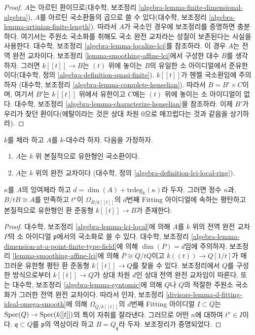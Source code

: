 \begin{proof}
$A$는 아르틴 환이므로(대수학, 보조정리
\ref{algebra-lemma-finite-dimensional-algebra}), $A$를 아르틴 국소환들의
곱으로 쓸 수 있다(대수학, 보조정리
\ref{algebra-lemma-artinian-finite-length}). 따라서 $A$가 국소인 경우에
보조정리를 증명하면 충분하다. 여기서는 주원소 국소화를 취해도 국소 완전
교차라는 성질이 보존된다는 사실을 사용한다. 대수학, 보조정리
\ref{algebra-lemma-localize-lci}를 참조하라. 이 경우 $A$는 전역 완전
교차이다. 보조정리 \ref{lemma-smoothing-affine-lci}에서 구성한 대수
$B$를 생각하자. 그러면 $k[[t]] \to B$는 $(t)$ 위에 놓이는 $B$의 유일한
소 아이디얼에서 준유한이다(대수학, 정의
\ref{algebra-definition-quasi-finite}). $k[[t]]$가 헨젤 국소환임에 주의하자
(대수학, 보조정리 \ref{algebra-lemma-complete-henselian}). 따라서
$B = B' \times C$이며, 여기서 $B'$는 $k[[t]]$ 위에서 유한이고 $C$에는
$(t)$ 위에 놓이는 소 아이디얼이 없다. 대수학, 보조정리
\ref{algebra-lemma-characterize-henselian}을 참조하라. 이제 $B'$가 우리가
찾던 환이다(에탈이라는 것은 상대 차원 $0$으로 매끄럽다는 것과 같음을
상기하라).
\end{proof}

\begin{lemma}
\label{lemma-smoothing-at-lci-point}
$k$를 체라 하고 $A$를 $k$-대수라 하자. 다음을 가정하자.
\begin{enumerate}
\item $A$는 $k$ 위 본질적으로 유한형인 국소환이다.
\item $A$는 $k$ 위의 완전 교차이다
(대수학, 정의 \ref{algebra-definition-lci-local-ring}).
\end{enumerate}
$\kappa$를 $A$의 잉여체라 하고
$d = \dim(A) + \text{trdeg}_k(\kappa)$라 두자. 그러면 정수 $n$과,
$B/tB \cong A$를 만족하고 $t^n$이 $\Omega_{B/k[[t]]}$의 $d$번째 Fitting
아이디얼에 속하는 평탄하고 본질적으로 유한형인 환 준동형
$k[[t]] \to B$가 존재한다.%
\end{lemma}

\begin{proof}
대수학, 보조정리 \ref{algebra-lemma-lci-local}에 의해 $A$를 $k$ 위의
전역 완전 교차 $P$의 소 아이디얼 $\mathfrak p$에서의 국소화로 쓸 수
있다. 대수학, 보조정리
\ref{algebra-lemma-dimension-at-a-point-finite-type-field}에 의해
$\dim(P) = d$임에 주의하자. 보조정리
\ref{lemma-smoothing-affine-lci}에 의해 $P \cong Q/tQ$이고
$k((t)) \to Q[1/t]$가 매끄러운 유한형 평탄 환 준동형
$k[[t]] \to Q$를 찾을 수 있다. 보조정리에서 $Q$를 구성한 방식으로부터
$k[[t]] \to Q$가 상대 차원 $d$인 상대 전역 완전 교차임이 따른다.
또는 대수학, 보조정리 \ref{algebra-lemma-syntomic}에 의해 $Q$나 $Q$의
적절한 주원소 국소화가 그러한 전역 완전 교차이다. 따라서 인자, 보조정리
\ref{divisors-lemma-d-fitting-ideal-omega-smooth}에 의해
$\Omega_{Q/k[[t]]}$의 $d$번째 Fitting 아이디얼 $I \subset Q$는
$\mathop{\mathrm{Spec}}(Q) \to \mathop{\mathrm{Spec}}(k[[t]])$의 특이 자취를 잘라낸다. 그러므로 어떤
$n$에 대하여 $t^n \in I$이다. $\mathfrak q \subset Q$를
$\mathfrak p$의 역상이라 하고 $B = Q_\mathfrak q$라 두자. 보조정리가
증명되었다.
\end{proof}

